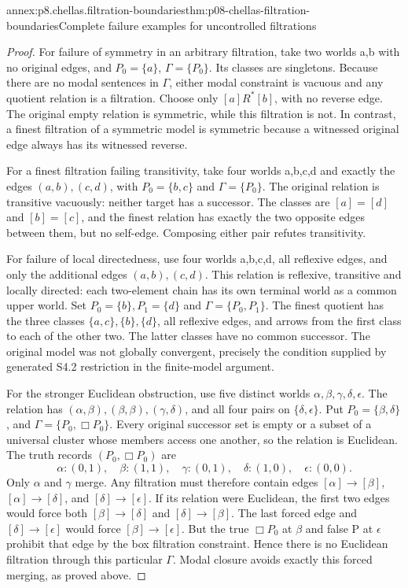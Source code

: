\begin{annexitem}{annex:p8.chellas.filtration-boundaries}{thm:p08-chellas-filtration-boundaries}{Complete failure examples for uncontrolled filtrations}
\begin{proof}
For failure of symmetry in an arbitrary filtration, take two worlds
a,b with no original edges, and \(P_0=\{a\}\),
\(\Gamma=\{P_0\}\). Its classes are singletons. Because there
are no modal sentences in \(\Gamma\), either modal constraint
is vacuous and any quotient relation is a filtration. Choose only
\([a]R^*[b]\), with no reverse edge. The original empty relation
is symmetric, while this filtration is not. In contrast, a finest
filtration of a symmetric model is symmetric because a witnessed
original edge always has its witnessed reverse.

For a finest filtration failing transitivity, take four worlds
a,b,c,d and exactly the edges \((a,b),(c,d)\), with
\(P_0=\{b,c\}\) and \(\Gamma=\{P_0\}\). The original
relation is transitive vacuously: neither target has a successor.
The classes are \([a]=[d]\) and \([b]=[c]\), and the finest
relation has exactly the two opposite edges between them, but no
self-edge. Composing either pair refutes transitivity.

For failure of local directedness, use four worlds a,b,c,d,
all reflexive edges, and only the additional edges
\((a,b),(c,d)\). This relation is reflexive, transitive and
locally directed: each two-element chain has its own terminal
world as a common upper world. Set
\(P_0=\{b\},P_1=\{d\}\) and
\(\Gamma=\{P_0,P_1\}\). The finest quotient has the three
classes \(\{a,c\},\{b\},\{d\}\), all reflexive edges,
and arrows from the first class to each of the other two.
The latter classes have no common successor. The original model
was not globally convergent, precisely the condition supplied by
generated S4.2 restriction in the finite-model argument.

For the stronger Euclidean obstruction, use five distinct worlds
\(\alpha,\beta,\gamma,\delta,\epsilon\). The relation has
\((\alpha,\beta),(\beta,\beta),(\gamma,\delta)\), and all
four pairs on \(\{\delta,\epsilon\}\). Put
\(P_0=\{\beta,\delta\}\), and
\(\Gamma=\{P_0,\Box P_0\}\). Every original successor
set is empty or a subset of a universal cluster whose members
access one another, so the relation is Euclidean. The truth
records \((P_0,\Box P_0)\) are
\[
 \alpha:(0,1),\quad\beta:(1,1),\quad
 \gamma:(0,1),\quad\delta:(1,0),\quad\epsilon:(0,0).
\]
Only \(\alpha\) and \(\gamma\) merge. Any filtration must
therefore contain edges
\([\alpha]\to[\beta]\), \([\alpha]\to[\delta]\),
and \([\delta]\to[\epsilon]\). If its relation were
Euclidean, the first two edges would force both
\([\beta]\to[\delta]\) and \([\delta]\to[\beta]\).
The last forced edge and \([\delta]\to[\epsilon]\) would
force \([\beta]\to[\epsilon]\). But the true
\(\Box P_0\) at \(\beta\) and false P at \(\epsilon\)
prohibit that edge by the box filtration constraint. Hence there
is no Euclidean filtration through this particular \(\Gamma\).
Modal closure avoids exactly this forced merging, as proved above.
\end{proof}
\end{annexitem}

